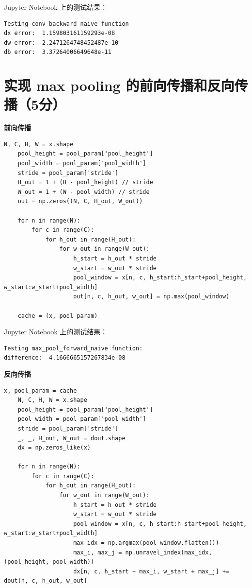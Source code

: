 Jupyter Notebook 上的测试结果：

\begin{lstlisting}[style=cleanpython]
Testing conv_backward_naive function
dx error:  1.159803161159293e-08
dw error:  2.2471264748452487e-10
db error:  3.37264006649648e-11
\end{lstlisting}

\section{实现 max pooling 的前向传播和反向传播（5分）}

\textbf{前向传播}

\begin{lstlisting}[style=cleanpython]
    N, C, H, W = x.shape
    pool_height = pool_param['pool_height']
    pool_width = pool_param['pool_width']
    stride = pool_param['stride']
    H_out = 1 + (H - pool_height) // stride
    W_out = 1 + (W - pool_width) // stride
    out = np.zeros((N, C, H_out, W_out))

    for n in range(N):
        for c in range(C):
            for h_out in range(H_out):
                for w_out in range(W_out):
                    h_start = h_out * stride
                    w_start = w_out * stride
                    pool_window = x[n, c, h_start:h_start+pool_height, w_start:w_start+pool_width]
                    out[n, c, h_out, w_out] = np.max(pool_window)

    cache = (x, pool_param)
\end{lstlisting}

Jupyter Notebook 上的测试结果：

\begin{lstlisting}[style=cleanpython]
Testing max_pool_forward_naive function:
difference:  4.1666665157267834e-08
\end{lstlisting}

\textbf{反向传播}

\begin{lstlisting}[style=cleanpython]
    x, pool_param = cache
    N, C, H, W = x.shape
    pool_height = pool_param['pool_height']
    pool_width = pool_param['pool_width']
    stride = pool_param['stride']
    _, _, H_out, W_out = dout.shape
    dx = np.zeros_like(x)

    for n in range(N):
        for c in range(C):
            for h_out in range(H_out):
                for w_out in range(W_out):
                    h_start = h_out * stride
                    w_start = w_out * stride
                    pool_window = x[n, c, h_start:h_start+pool_height, w_start:w_start+pool_width]
                    max_idx = np.argmax(pool_window.flatten())
                    max_i, max_j = np.unravel_index(max_idx, (pool_height, pool_width))
                    dx[n, c, h_start + max_i, w_start + max_j] += dout[n, c, h_out, w_out]
\end{lstlisting}

